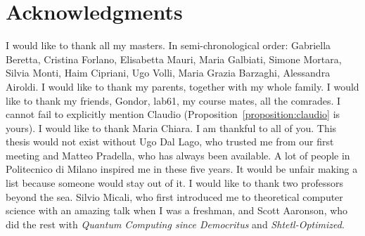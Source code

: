 

\bigskip

\begingroup
\let\clearpage\relax
\let\cleardoublepage\relax
\let\cleardoublepage\relax
\chapter*{Acknowledgments}
I would like to thank all my masters. In semi-chronological order: Gabriella Beretta, Cristina Forlano, Elisabetta Mauri, Maria Galbiati, Simone Mortara, Silvia Monti, Haim Cipriani, Ugo Volli, Maria Grazia Barzaghi, Alessandra Airoldi. I would like to thank my parents, together with my whole family. I would like to thank my friends, Gondor, lab61, my course mates, all the comrades. I cannot fail to explicitly mention Claudio (Proposition~\ref{proposition:claudio} is yours). I would like to thank Maria Chiara. I am thankful to all of you. This thesis would not exist without Ugo Dal Lago, who trusted me from our first meeting and Matteo Pradella, who has always been available. A lot of people in Politecnico di Milano inspired me in these five years. It would be unfair making a list because someone would stay out of it. I would like to thank two professors beyond the sea. Silvio Micali, who first introduced me to theoretical computer science with an amazing talk when I was a freshman, and Scott Aaronson, who did the rest with \emph{Quantum Computing since Democritus} and \emph{Shtetl-Optimized}.


\endgroup



